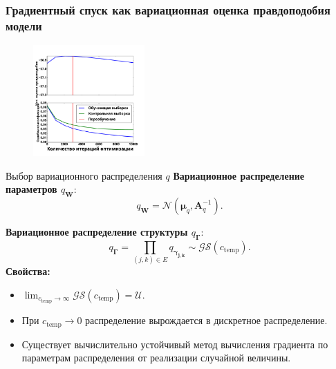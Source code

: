 \documentclass[usenames,dvipsnames,11pt,pdf,utf8,russian,aspectratio=169]{beamer}
\begin{document}
\begin{frame}
\frametitle{Градиентный спуск как вариационная оценка правдоподобия модели}
\footnotesize

\begin{multicols}{2}

\begin{figure}
\end{figure}

\columnbreak


\begin{figure}
{\includegraphics[width=0.38\textwidth]{./slide_plots/sgd_show.pdf}}
\end{figure}
\end{multicols}
\end{frame}


   
\begin{frame}{Выбор вариационного распределения $q$}
\textbf{Вариационное распределение параметров $q_{\mathbf{W}}:$}
$$q_\mathbf{W} = \mathcal{N}(\boldsymbol{\mu}_q, \mathbf{A}^{-1}_q).$$

\textbf{Вариационное распределение структуры $q_{\boldsymbol{\Gamma}}:$}
$$q_{\boldsymbol{\Gamma}} = \prod_{(j,k) \in E} q_{\boldsymbol{\gamma_{j,k}}} \sim \mathcal{GS}(c_\text{temp}).$$
\textbf{Свойства:}
\begin{itemize}
\item $\lim_{c_\text{temp} \to \infty}  \mathcal{GS}(c_\text{temp}) = \mathcal{U}.$
\item При ${c_\text{temp} \to 0}$ распределение вырождается в дискретное распределение.
\item Существует вычислительно устойчивый метод вычисления градиента по параметрам распределения от реализации случайной величины.
\end{itemize}
\end{frame}
\end{document}
